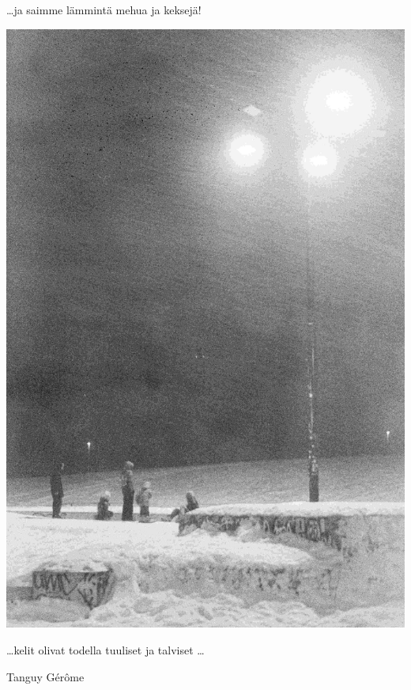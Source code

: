 \begin{multicols}{2}
	\ldots ja saimme lämmintä mehua ja \mbox{keksejä!}
	\columnbreak

	\vspace*{1.28cm}
	\noindent\includegraphics[width=\linewidth]{assets/laskiaistiistai4}

	\ldots kelit olivat todella tuuliset ja \mbox{talviset} \ldots

	\vfill
	\medskip
	\noindent\null\hfill \normalsize Tanguy Gérôme\par

\end{multicols}
